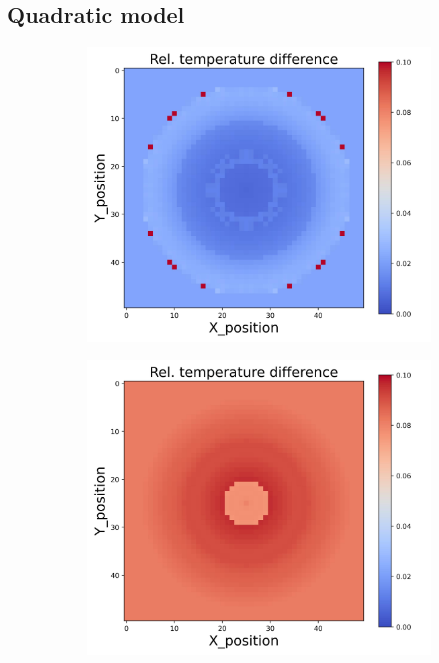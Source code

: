 {\subsection{Quadratic model}
\begin{figure}[h]
    \centering
    \begin{minipage}{\textwidth}
        \centering
        \begin{subfigure}{0.27\textwidth}
            \centering
            \includegraphics[width=\textwidth]{figures/raw_data/0/quad/T_bias.jpg}
        \end{subfigure}
        \begin{subfigure}{0.27\textwidth}
            \centering
            \includegraphics[width=\textwidth]{figures/raw_data/5/quad/T_bias.jpg}

\end{subfigure}
\end{minipage}
\end{figure}}

